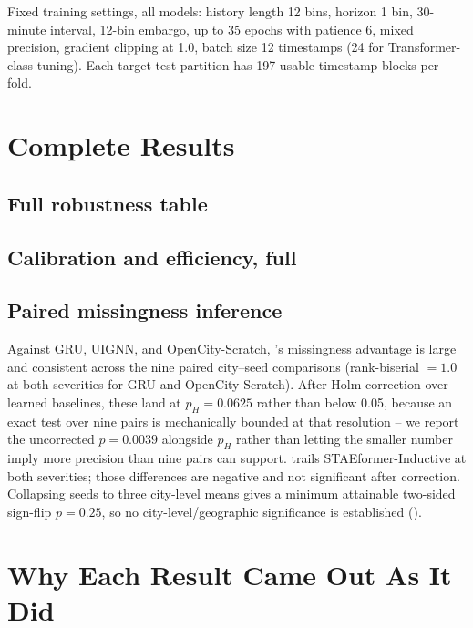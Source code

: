 Fixed training settings, all models: history length 12 bins, horizon 1 bin, 30-minute interval,
12-bin embargo, up to 35 epochs with patience 6, mixed precision, gradient clipping at 1.0, batch
size 12 timestamps (24 for Transformer-class tuning). Each target test partition has 197 usable
timestamp blocks per fold.

\section{Complete Results}
\label{app:complete-results}



\subsection{Full robustness table}
\label{app:robustness-full}


\subsection{Calibration and efficiency, full}
\label{app:calibration}
\label{app:efficiency}




\subsection{Paired missingness inference}
\label{app:paired-inference}

Against GRU, UIGNN, and OpenCity-Scratch, \methodname{}'s missingness advantage is large and
consistent across the nine paired city--seed comparisons (rank-biserial $=1.0$ at both severities
for GRU and OpenCity-Scratch). After Holm correction over learned baselines, these land at
$p_H=0.0625$ rather than below 0.05, because an exact test over nine pairs is mechanically bounded
at that resolution -- we report the uncorrected $p=0.0039$ alongside $p_H$ rather than letting the
smaller number imply more precision than nine pairs can support. \methodname{} trails
STAEformer-Inductive at both severities; those differences are negative and not significant after
correction. Collapsing seeds to three city-level means gives a minimum attainable two-sided
sign-flip $p=0.25$, so no city-level/geographic significance is established ().

\section{Why Each Result Came Out As It Did}
\label{app:why}


